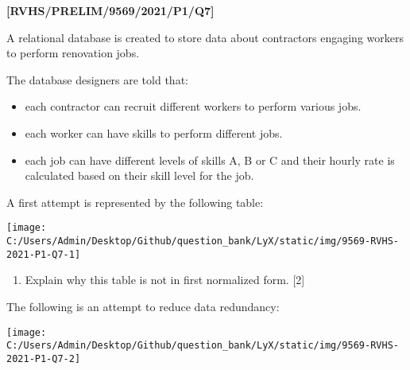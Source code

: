 \item \textbf{{[}RVHS/PRELIM/9569/2021/P1/Q7{]} }

A relational database is created to store data about contractors engaging
workers to perform renovation jobs. 

The database designers are told that: 
\begin{itemize}
\item each contractor can recruit different workers to perform various jobs.
\item each worker can have skills to perform different jobs. 
\item each job can have different levels of skills \textquotedbl A\textquotedbl ,
\textquotedbl B\textquotedbl{} or \textquotedbl C\textquotedbl{}
and their hourly rate is calculated based on their skill level for
the job. 
\end{itemize}
A first attempt is represented by the following table: 
\begin{center}
\texttt{[image: C:/Users/Admin/Desktop/Github/question\_bank/LyX/static/img/9569-RVHS-2021-P1-Q7-1]}
\par\end{center}
\begin{enumerate}
\item Explain why this table is not in first normalized form. \hfill{}{[}2{]}
\end{enumerate}
The following is an attempt to reduce data redundancy: 
\begin{center}
\texttt{[image: C:/Users/Admin/Desktop/Github/question\_bank/LyX/static/img/9569-RVHS-2021-P1-Q7-2]}
\par\end{center}
